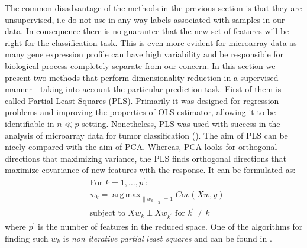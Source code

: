 \documentclass[12pt, wide]{mwart}
\DeclareMathOperator*{\argmax}{arg\,max}
\begin{document}
The common disadvantage of the methods in the previous section is that they are unsupervised, i.e do not use in any way labels associated with samples in our data. In consequence there is no guarantee that the new set of features will be right for the classification task. This is even more evident for microarray data as many gene expression profile can have high variability and be responsible for biological process completely separate from our concern. In this section we present two methods that perform dimensionality reduction in a supervised manner - taking into account the particular prediction task. First of them is called Partial Least Squares (PLS). Primarily it was designed for regression problems and improving the properties of OLS estimator, allowing it to be identifiable in $n \ll p$ setting. Nonetheless, PLS was used with success in the analysis of microarray data for tumor classification (\cite{TumorPLS}). The aim of PLS can be nicely compared with the aim of PCA. Whereas, PCA looks for orthogonal directions that maximizing variance, the PLS finds orthogonal directions that maximize covariance of new features with the response. It can be formulated as:
\begin{align*}
& \text{For $k=1, \ldots, p^{\prime}$}: \\
& w_k = \argmax_{\|w_k\|_2 = 1} Cov \left(Xw,y\right) \\
&\text{subject to } Xw_k \ \bot \  Xw_{k^{\prime}} \text{ for } k^{\prime} \neq k  
\end{align*}
where $p^{\prime}$ is the number of features in the reduced space. One of the algorithms for finding such $w_k$ is \textit{non iterative partial least squares} and can be found in \cite[chapter 3.5.2]{ESL2}. 
\end{document}
